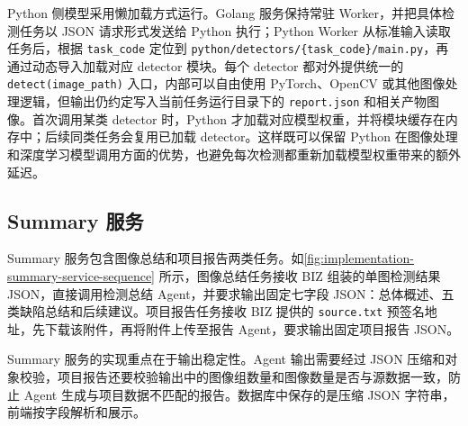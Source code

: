Python 侧模型采用懒加载方式运行。Golang 服务保持常驻 Worker，并把具体检测任务以 JSON 请求形式发送给 Python 执行；Python Worker 从标准输入读取任务后，根据 \texttt{task\_code} 定位到 \texttt{python/detectors/\{task\_code\}/main.py}，再通过动态导入加载对应 detector 模块。每个 detector 都对外提供统一的 \texttt{detect(image\_path)} 入口，内部可以自由使用 PyTorch、OpenCV 或其他图像处理逻辑，但输出仍约定写入当前任务运行目录下的 \texttt{report.json} 和相关产物图像。首次调用某类 detector 时，Python 才加载对应模型权重，并将模块缓存在内存中；后续同类任务会复用已加载 detector。这样既可以保留 Python 在图像处理和深度学习模型调用方面的优势，也避免每次检测都重新加载模型权重带来的额外延迟。

\subsection{Summary 服务}
\label{subsec:implementation-summary-service}

Summary 服务包含图像总结和项目报告两类任务。如\cref{fig:implementation-summary-service-sequence} 所示，图像总结任务接收 BIZ 组装的单图检测结果 JSON，直接调用检测总结 Agent，并要求输出固定七字段 JSON：总体概述、五类缺陷总结和后续建议。项目报告任务接收 BIZ 提供的 \texttt{source.txt} 预签名地址，先下载该附件，再将附件上传至报告 Agent，要求输出固定项目报告 JSON。

Summary 服务的实现重点在于输出稳定性。Agent 输出需要经过 JSON 压缩和对象校验，项目报告还要校验输出中的图像组数量和图像数量是否与源数据一致，防止 Agent 生成与项目数据不匹配的报告。数据库中保存的是压缩 JSON 字符串，前端按字段解析和展示。

